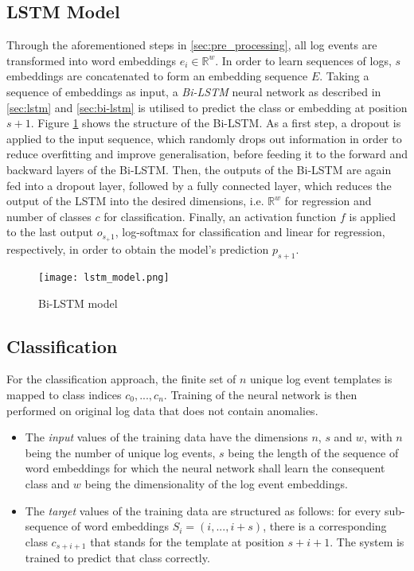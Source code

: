 \subsection{LSTM Model\label{sec:lstm-model}}
Through the aforementioned steps in \ref{sec:pre_processing}, all log events are transformed into word embeddings $e_i \in \mathbb{R}^w$. In order to learn sequences of logs, $s$ embeddings are concatenated to form an embedding sequence $E$. Taking a sequence of embeddings as input, a \textit{Bi-LSTM} neural network as described in \ref{sec:lstm} and \ref{sec:bi-lstm} is utilised to predict the class or embedding at position $s+1$. Figure \ref{fig:lstm_model} shows the structure of the Bi-LSTM. As a first step, a dropout is applied to the input sequence, which randomly drops out information in order to reduce overfitting and improve generalisation, before feeding it to the forward and backward layers of the Bi-LSTM. Then, the outputs of the Bi-LSTM are again fed into a dropout layer, followed by a fully connected layer, which reduces the output of the LSTM into the desired dimensions, i.e. $\mathbb{R}^w$ for regression and number of classes $c$ for classification. Finally, an activation function $f$ is applied to the last output $o_{s_+1}$, log-softmax for classification and linear for regression, respectively, in order to obtain the model's prediction $p_{s+1}$.


\begin{figure}[H]
	\centering	
	\texttt{[image: lstm\_model.png]}
	\caption{Bi-LSTM model}
	\label{fig:lstm_model}
\end{figure}

\subsection{Classification \label{sec:classification}}
For the classification approach, the finite set of $n$ unique log event templates is mapped to class indices $c_0, ..., c_n$. Training of the neural network is then performed on original log data that does not contain anomalies.
\begin{itemize}
\setlength\itemsep{-0.5em}
	\item The \textit{input} values of the training data have the dimensions $n$, $s$ and $w$, with $n$ being the number of unique log events, $s$ being the length of the sequence of word embeddings for which the neural network shall learn the consequent class and $w$ being the dimensionality of the log event embeddings.
	\item The \textit{target} values of the training data are structured as follows: for every sub-sequence of word embeddings $S_i = (i, ..., i+s)$, there is a corresponding class $c_{s+i+1}$ that stands for the template at position $s+i+1$. The system is trained to predict that class correctly.
\end{itemize}

